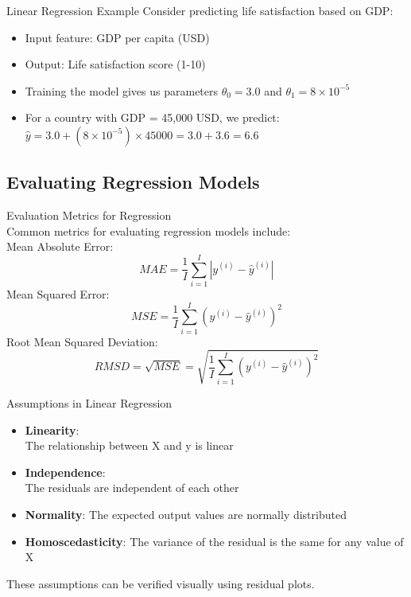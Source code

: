 \begin{example2}{Linear Regression Example}
Consider predicting life satisfaction based on GDP:
\begin{itemize}
    \item Input feature: GDP per capita (USD)
    \item Output: Life satisfaction score (1-10)
    \item Training the model gives us parameters $\theta_0 = 3.0$ and $\theta_1 = 8 \times 10^{-5}$
    \item For a country with GDP = 45,000 USD, we predict:
    $\hat{y} = 3.0 + (8 \times 10^{-5}) \times 45000 = 3.0 + 3.6 = 6.6$
\end{itemize}
\end{example2}

\subsection{Evaluating Regression Models}


\begin{theorem}{Evaluation Metrics for Regression}\\
Common metrics for evaluating regression models include:\\
    Mean Absolute Error: 
    $$MAE = \frac{1}{I} \sum_{i=1}^{I} |y^{(i)}-\hat{y}^{(i)}|$$
    Mean Squared Error: 
    $$MSE = \frac{1}{I}\sum_{i=1}^{I}(y^{(i)}-\hat{y}^{(i)})^2$$
    Root Mean Squared Deviation: 
    $$RMSD = \sqrt{MSE} = \sqrt{\frac{1}{I}\sum_{i=1}^{I}(y^{(i)}-\hat{y}^{(i)})^2}$$
\end{theorem}

\begin{concept}{Assumptions in Linear Regression}
\begin{itemize}
    \item \textbf{Linearity}: \\The relationship between X and y is linear
    \item \textbf{Independence}: \\The residuals are independent of each other
    \item \textbf{Normality}: The expected output values are normally distributed
    \item \textbf{Homoscedasticity}: The variance of the residual is the same for any value of X
\end{itemize}
These assumptions can be verified visually using residual plots.
\end{concept}

